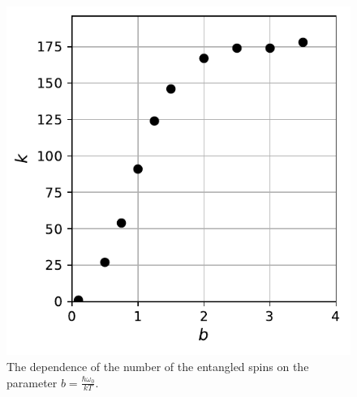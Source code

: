 \documentclass[
    pra,  
    twocolumn, 
    floatfix, 
    amsmath, 
    amssymb, 
    superscriptaddress
]{revtex4-1}
\begin{document}
\begin{figure}
    \centering
    \includegraphics{k_b.pdf}
    \caption{The dependence of the number of the entangled spins on the parameter $b = \frac{\hbar\omega_0}{kT} $.}
    \label{fig:k_b}
\end{figure}
\end{document}
